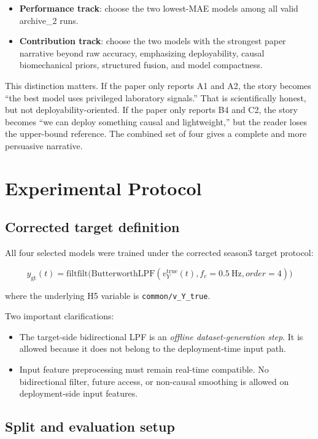 \documentclass[11pt,a4paper]{article}
\begin{document}
\begin{itemize}
\item \textbf{Performance track}: choose the two lowest-MAE models among all valid archive\_2 runs.
\item \textbf{Contribution track}: choose the two models with the strongest paper narrative beyond raw accuracy, emphasizing deployability, causal biomechanical priors, structured fusion, and model compactness.
\end{itemize}

This distinction matters.
If the paper only reports A1 and A2, the story becomes ``the best model uses privileged laboratory signals.''
That is scientifically honest, but not deployability-oriented.
If the paper only reports B4 and C2, the story becomes ``we can deploy something causal and lightweight,'' but the reader loses the upper-bound reference.
The combined set of four gives a complete and more persuasive narrative.

\section{Experimental Protocol}

\subsection{Corrected target definition}

All four selected models were trained under the corrected season3 target protocol:

\[
y_{\mathrm{gt}}(t) = \mathrm{filtfilt}\bigl(\mathrm{ButterworthLPF}(v_Y^{\mathrm{true}}(t), f_c=0.5\ \mathrm{Hz}, order=4)\bigr)
\]

where the underlying H5 variable is \texttt{common/v\_Y\_true}.

Two important clarifications:
\begin{itemize}
\item The target-side bidirectional LPF is an \emph{offline dataset-generation step}. It is allowed because it does not belong to the deployment-time input path.
\item Input feature preprocessing must remain real-time compatible. No bidirectional filter, future access, or non-causal smoothing is allowed on deployment-side input features.
\end{itemize}

\subsection{Split and evaluation setup}
\end{document}
